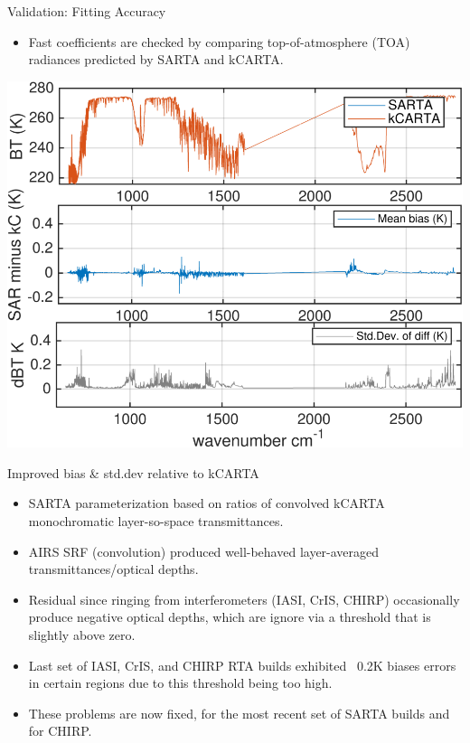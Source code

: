 \documentclass[10pt,t]{beamer}
\begin{document}
\begin{frame}[shrink=5]{Validation: Fitting Accuracy}


\begin{itemize}
    \item Fast coefficients are checked by comparing top-of-atmosphere (TOA) radiances predicted by SARTA and kCARTA.
   \end{itemize}
    \begin{center}
    \includegraphics[width=0.6\linewidth]{./Figs/kc_sar_airs_l1c_mean_bias_stdv_sea_6angs_aslp.png}
  \end{center}
  
\end{frame}
\begin{frame}{Improved bias \& std.dev relative to kCARTA}

  \begin{itemize}
  \item SARTA parameterization based on ratios of convolved kCARTA monochromatic layer-so-space transmittances.
  \item AIRS SRF (convolution) produced well-behaved layer-averaged transmittances/optical depths.
  \item Residual since ringing from interferometers (IASI, CrIS, CHIRP) occasionally produce negative optical depths, which are ignore via a threshold that is slightly above zero.
  \item Last set of  IASI, CrIS, and CHIRP RTA builds exhibited ~0.2K biases errors in certain regions due to this threshold being too high.
  \item These problems are now fixed, for the most recent set of SARTA builds and for CHIRP.
  \end{itemize}

\end{frame}
\end{document}
